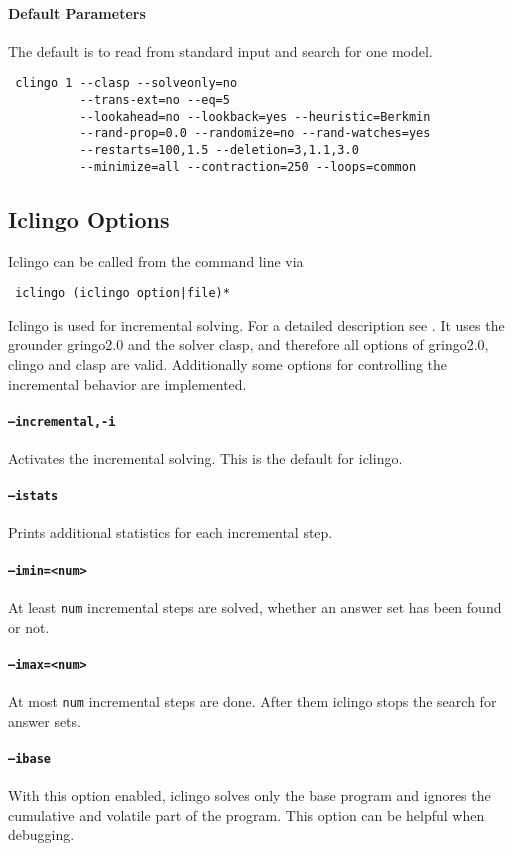 \documentclass[a4paper,10pt]{article}
\begin{document}
\paragraph{Default Parameters}
The default is to read from standard input and search for one model.
\begin{verbatim}
 clingo 1 --clasp --solveonly=no
          --trans-ext=no --eq=5 
          --lookahead=no --lookback=yes --heuristic=Berkmin
          --rand-prop=0.0 --randomize=no --rand-watches=yes
          --restarts=100,1.5 --deletion=3,1.1,3.0
          --minimize=all --contraction=250 --loops=common
\end{verbatim}

\subsection{Iclingo Options}
Iclingo can be called from the command line via
\begin{verbatim}
 iclingo (iclingo option|file)*
\end{verbatim}
Iclingo is used for incremental solving. For a detailed description see \cite{gekaosscth08a}.
It uses the grounder gringo2.0 and the solver clasp, and therefore all options of gringo2.0, clingo and clasp are valid.
Additionally some options for controlling the incremental behavior are implemented.
\paragraph{\texttt{--incremental,-i}}
Activates the incremental solving. This is the default for iclingo.
\paragraph{\texttt{--istats}}
Prints additional statistics for each incremental step.
\paragraph{\texttt{--imin=<num>}}
At least \texttt{num} incremental steps are solved, whether an answer set has been found or not.
\paragraph{\texttt{--imax=<num>}}
At most \texttt{num} incremental steps are done. After them iclingo stops the search for answer sets.
\paragraph{\texttt{--ibase}}
With this option enabled, iclingo solves only the base program and ignores the cumulative and volatile part of the program.
This option can be helpful when debugging.
\end{document}
